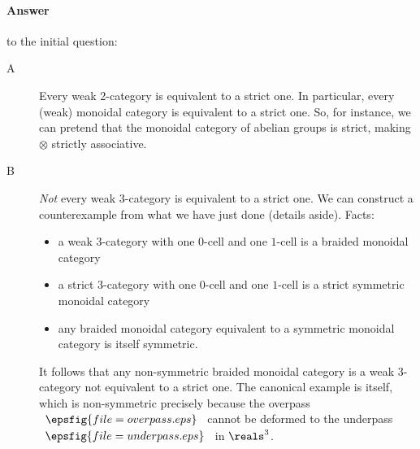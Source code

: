 \paragraph{Answer} to the initial question:

\begin{description}
\item[A] Every weak 2-category is equivalent%
%
%
to a strict one.
In particular, every (weak) monoidal category is equivalent to a strict one.
So, for instance, we can pretend that the monoidal category of abelian groups
is strict, making $\otimes$ strictly associative.%
%
%

\item[B] \emph{Not} every weak 3-category is equivalent%
%
%
to a strict one.
We can construct a counterexample from what we have just done (details
aside).  Facts:
%
\begin{itemize}
\item a weak 3-category with one $0$-cell and one $1$-cell is a braided%
%
%
monoidal category
\item a strict 3-category with one $0$-cell and one $1$-cell is a strict
symmetric monoidal category
\item any braided monoidal category equivalent to a symmetric monoidal
category is itself symmetric.
\end{itemize}
%
It follows that any non-symmetric braided monoidal category is a weak
3-category not equivalent to a strict one.  The canonical example is
 itself, which is non-symmetric precisely because the overpass
$\begin{array}{c} 
\epsfig{file=overpass.eps}
\end{array}$
cannot be deformed to the underpass 
$\begin{array}{c}
\epsfig{file=underpass.eps}
\end{array}$
in $\reals^3$.
\end{description}%
%
%




